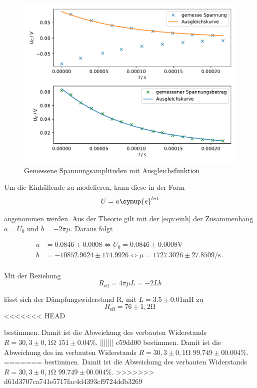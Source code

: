 \newpage
\begin{figure}
    \centering
    \label{fig:1}
    \includegraphics{Daten/a.pdf}
    \caption{Gemessene Spannungsamplituden mit Ausgleichsfunktion}
\end{figure}

Um die Einhüllende zu modelieren, kann diese in der Form
\begin{equation}
    U = a \symup{e}^{b*t}
\end{equation}

\noindent
angenommen werden. Aus der Theorie gilt mit der \autoref{eqn:einh} der Zusammenhang $a = U_0$ und $b = -2 \pi \mu$. Daraus folgt %


\begin{align*}
    a &= 0.0846 \pm 0.0008 \Leftrightarrow U_0 = 0.0846 \pm 0.0008 \si{\volt} \\
    b &= -10852.9624 \pm 174.9926 \Leftrightarrow \mu = 1727.3026 \pm 27.8509 \si{\per\second} \, .\\
\end{align*}

\noindent
Mit der Beziehung 
\begin{equation}
    R_\text{eff} = 4\pi\mu L = -2 L b
\end{equation}

\noindent
lässt sich der Dämpfungswiderstand R, mit $L = 3.5 \pm 0.01 \si{\milli\henry}$ zu
\begin{equation*}
    R_\text{eff} = 76 \pm 1,2 \si{\ohm}
\end{equation*}
<<<<<<< HEAD

\noindent
bestimmen. Damit ist die Abweichung des verbauten Widerstands $R = 30,3 \pm 0,1 \si{\ohm}$ $151 \pm 0.04 \si{\percent}$.
||||||| c59dd00
bestimmen. Damit ist die Abweichung des im verbauten Widerstands $R = 30,3 \pm 0,1 \si{\ohm}$ $99.749 \pm 00.004 \si{\percent}$.
=======
bestimmen. Damit ist die Abweichung des verbauten Widerstands $R = 30,3 \pm 0,1 \si{\ohm}$ $99.749 \pm 00.004 \si{\percent}$.
>>>>>>> d61d3707ca741e5717fac4d4393cf9724ddb3269

